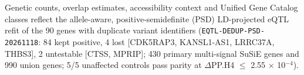 Genetic counts, overlap estimates, accessibility context and Unified Gene Catalog classes reflect the allele-aware, positive-semidefinite (PSD) LD-projected eQTL refit of the 90 genes with duplicate variant identifiers (\texttt{EQTL-DEDUP-PSD-20261118}: 84 kept positive, 4 lost [CDK5RAP3, KANSL1-AS1, LRRC37A, THBS3], 2 untestable [CTSS, MPRIP]; 430 primary multi-signal SuSiE genes and 990 union genes; 5/5 unaffected controls pass parity at \textbar $\Delta$PP.H4\textbar{} $\le$ 2.55 $\times$ 10$^{-4}$).
